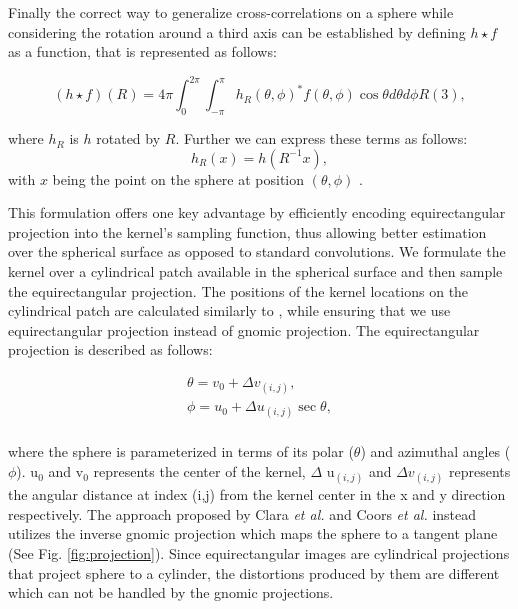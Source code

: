 \documentclass[final]{cvpr}
\begin{document}
Finally the correct way to generalize cross-correlations on a sphere while considering the rotation around a third axis \cite{kondor2018clebschgordan} can be established by defining ${h \star f}$ as a function, that is represented as follows:

\begin{equation}\label{eq: S^2 xcorr}
(h \star f)(R)=
4\pi\int_{0}^{2\pi}\int_{-\pi}^{\pi} h_R(\theta,\phi)^\ast
f(\theta,\phi)\cos\theta d\theta d\phi
R(3),
\end{equation}

where ${h_R}$ is ${h}$ rotated by ${R}$. Further we can express these terms as follows:
\begin{equation}\label{eq: rotation}
h_R(x)=h(R^{-1}x),
\end{equation}
with ${x}$ being the point on the sphere at position ${(\theta,\phi)}$ . 

This formulation offers one key advantage by efficiently encoding equirectangular projection into the kernel's sampling function, thus allowing better estimation over the spherical surface as opposed to standard convolutions. We formulate the kernel over a cylindrical patch available in the spherical surface and then sample the equirectangular projection. The positions of the kernel locations on the cylindrical patch are calculated similarly to \cite{coors2018spherenet}, while ensuring that we use equirectangular projection instead of gnomic projection. The equirectangular projection is described as follows: 



\small
\begin{equation}\label{eq:equiconv}
  \begin{aligned}
  \theta = v_{0} + \Delta v_{(i,j)},\\
  \phi = u_{0} + \Delta u_{(i,j)}\sec \theta,\\
  \end{aligned}
\end{equation}



where the sphere is parameterized in terms of its polar ($\theta$) and azimuthal angles ($\phi$). u$_{0}$ and v$_{0}$ represents the center of the kernel, $\Delta$ u$_{(i,j)}$ and $\Delta v_{(i,j)}$ represents the angular distance at index (i,j) from the kernel center in the x and y direction respectively. The approach proposed by Clara \textit{et al.} \cite{fernandez2020corners} and Coors \textit{et al.} \cite{coors2018spherenet} instead utilizes the inverse gnomic projection which maps the sphere to a tangent plane (See Fig. \ref{fig:projection}).
Since equirectangular images are cylindrical projections that project sphere to a cylinder, the distortions produced by them are different which can not be handled by the gnomic projections.
\end{document}
